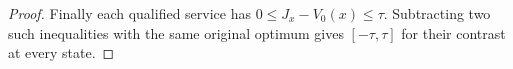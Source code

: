 \begin{proof}
Finally each qualified service has
\(0\leq J_x-V_0(x)\leq\tau\).
Subtracting two such inequalities
with the same original optimum
gives \([-\tau,\tau]\) for their
contrast at every state.
\end{proof}

